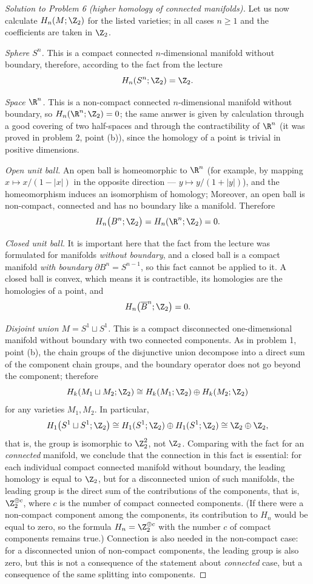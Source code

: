 \documentclass[a4paper,12pt]{report}
\begin{document}
\begin{proof}[Solution to Problem \textup{6} \textup{(}higher homology of connected manifolds\textup{)}]
Let us now calculate $H_n(M;\Z_2)$ for the listed varieties; in all cases $n\ge1$ and the coefficients are taken in $\Z_2$.

\emph{Sphere $S^n$.} This is a compact connected $n$-dimensional manifold without boundary, therefore, according to the fact from the lecture
\[
H_n(S^n;\Z_2)=\Z_2 .
\]

\emph{Space $\R^n$.} This is a non-compact connected $n$-dimensional manifold without boundary, so $H_n(\R^n;\Z_2)=0$; the same answer is given by calculation through a good covering of two half-spaces and through the contractibility of $\R^n$ \textup{(}it was proved in problem \textup{2}, point \textup{(b)}\textup{)}, since the homology of a point is trivial in positive dimensions.

\emph{Open unit ball.} An open ball is homeomorphic to $\R^n$ \textup{(}for example, by mapping $x\mapsto x/(1-|x|)$ in the opposite direction --- $y\mapsto y/(1+|y|)$\textup{)}, and the homeomorphism induces an isomorphism of homology; Moreover, an open ball is non-compact, connected and has no boundary like a manifold. Therefore
\[
H_n\bigl(B^n;\Z_2\bigr)=H_n(\R^n;\Z_2)=0 .
\]

\emph{Closed unit ball.} It is important here that the fact from the lecture was formulated for manifolds \emph{without boundary}, and a closed ball is a compact manifold \emph{with boundary} $\partial B^n=S^{n-1}$, so this fact cannot be applied to it. A closed ball is convex, which means it is contractible, its homologies are the homologies of a point, and
\[
H_n\bigl(\overline B^n;\Z_2\bigr)=0 .
\]

\emph{Disjoint union $M=S^1\sqcup S^1$.} This is a compact disconnected one-dimensional manifold without boundary with two connected components. As in problem \textup{1}, point \textup{(b)}, the chain groups of the disjunctive union decompose into a direct sum of the component chain groups, and the boundary operator does not go beyond the component; therefore
\[
H_k(M_1\sqcup M_2;\Z_2)\cong H_k(M_1;\Z_2)\oplus H_k(M_2;\Z_2)
\]
for any varieties $M_1,M_2$. In particular,
\[
H_1\bigl(S^1\sqcup S^1;\Z_2\bigr)\cong H_1(S^1;\Z_2)\oplus H_1(S^1;\Z_2)\cong\Z_2\oplus\Z_2 ,
\]
that is, the group is isomorphic to $\Z_2^2$, not $\Z_2$. Comparing with the fact for an \emph{connected} manifold, we conclude that the connection in this fact is essential: for each individual compact connected manifold without boundary, the leading homology is equal to $\Z_2$, but for a disconnected union of such manifolds, the leading group is the direct sum of the contributions of the components, that is, $\Z_2^{\oplus c}$, where $c$ is the number of compact connected components. \textup{(}If there were a non-compact component among the components, its contribution to $H_n$ would be equal to zero, so the formula $H_n=\Z_2^{\oplus c}$ with the number $c$ of compact components remains true.\textup{)} Connection is also needed in the non-compact case: for a disconnected union of non-compact components, the leading group is also zero, but this is not a consequence of the statement about \emph{connected} case, but a consequence of the same splitting into components.


\end{proof}
\end{document}

